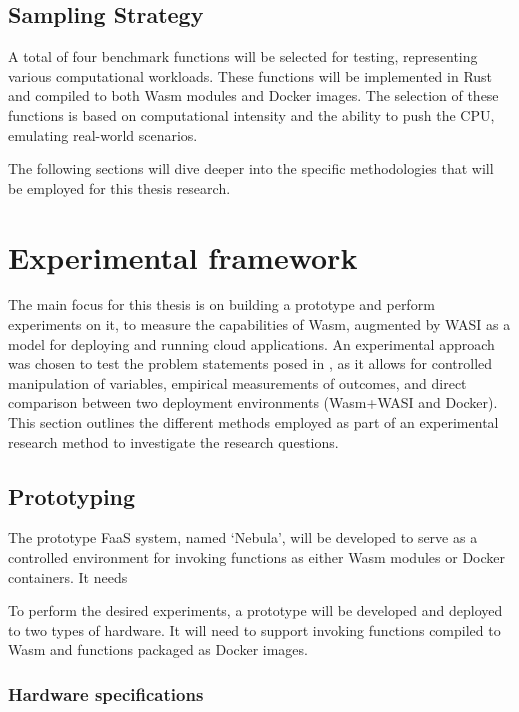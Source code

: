 \documentclass[
  table]{report}
\begin{document}
\subsection{Sampling Strategy}

A total of four benchmark functions will be selected for testing,
representing various computational workloads. These functions will be
implemented in Rust and compiled to both \ac{Wasm} modules and Docker
images. The selection of these functions is based on computational
intensity and the ability to push the CPU, emulating real-world
scenarios.

The following sections will dive deeper into the specific methodologies
that will be employed for this thesis research.

\section{Experimental framework}

The main focus for this thesis is on building a prototype and perform
experiments on it, to measure the capabilities of \ac{Wasm}, augmented
by \ac{WASI} as a model for deploying and running cloud applications. An
experimental approach was chosen to test the problem statements posed in
, as it allows for controlled manipulation of
variables, empirical measurements of outcomes, and direct comparison
between two deployment environments (\ac{Wasm}+\ac{WASI} and Docker).
This section outlines the different methods employed as part of an
experimental research method to investigate the research questions.

\subsection{Prototyping}

The prototype FaaS system, named `Nebula', will be developed to serve as
a controlled environment for invoking functions as either \ac{Wasm}
modules or Docker containers. It needs

To perform the desired experiments, a prototype will be developed and
deployed to two types of hardware. It will need to support invoking
functions compiled to \ac{Wasm} and functions packaged as Docker images.

\subsubsection{Hardware specifications}
\end{document}
